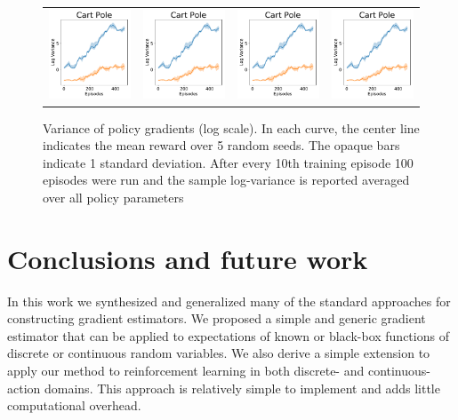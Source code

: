 \documentclass{article}
\begin{document}
\begin{figure}[h]
\centering
\hspace*{-.3in}
\begin{tabular}{cccc}
\setlength{\tabcolsep}{10pt}
\renewcommand{\arraystretch}{0}
\includegraphics[width=.25\linewidth]{figures/cp_paper_var} & 
\includegraphics[width=.25\linewidth]{figures/cp_paper_var} &
\includegraphics[width=.25\linewidth]{figures/cp_paper_var} & 
\includegraphics[width=.25\linewidth]{figures/cp_paper_var}\\
 \end{tabular}
\caption{Variance of policy gradients (log scale). In each curve, the center line indicates the mean reward over 5 random seeds. The opaque bars indicate 1 standard deviation. After every 10th training episode 100 episodes were run and the sample log-variance is reported averaged over all policy parameters}
\label{fig:rl_var}
\end{figure}


\section{Conclusions and future work}
\label{conclusion}
In this work we synthesized and generalized many of the standard approaches for constructing gradient estimators.
We proposed a simple and generic gradient estimator that can be applied to expectations of known or black-box functions of discrete or continuous random variables.
We also derive a simple extension to apply our method to reinforcement learning in both discrete- and continuous-action domains. 
This approach is relatively simple to implement and adds little computational overhead. 
\end{document}
